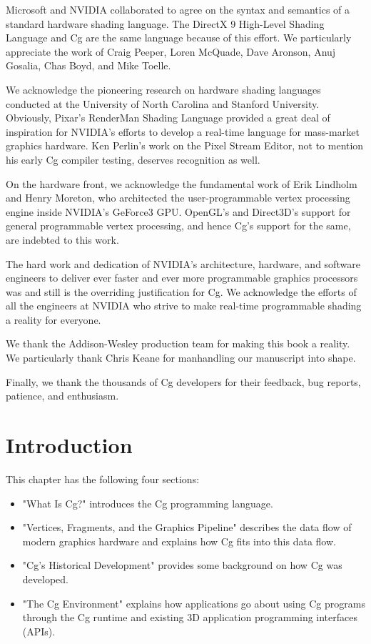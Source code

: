 \documentclass{book}
\begin{document}
Microsoft and NVIDIA collaborated to agree on the syntax and semantics of a standard hardware shading language. The DirectX 9 High-Level Shading Language and Cg are the same language because of this effort. We particularly appreciate the work of Craig Peeper, Loren McQuade, Dave Aronson, Anuj Gosalia, Chas Boyd, and Mike Toelle.

We acknowledge the pioneering research on hardware shading languages conducted at the University of North Carolina and Stanford University. Obviously, Pixar's RenderMan Shading Language provided a great deal of inspiration for NVIDIA's efforts to develop a real-time language for mass-market graphics hardware. Ken Perlin's work on the Pixel Stream Editor, not to mention his early Cg compiler testing, deserves recognition as well.

On the hardware front, we acknowledge the fundamental work of Erik Lindholm and Henry Moreton, who architected the user-programmable vertex processing engine inside NVIDIA's GeForce3 GPU. OpenGL's and Direct3D's support for general programmable vertex processing, and hence Cg's support for the same, are indebted to this work.

The hard work and dedication of NVIDIA's architecture, hardware, and software engineers to deliver ever faster and ever more programmable graphics processors was and still is the overriding justification for Cg. We acknowledge the efforts of all the engineers at NVIDIA who strive to make real-time programmable shading a reality for everyone.

We thank the Addison-Wesley production team for making this book a reality. We particularly thank Chris Keane for manhandling our manuscript into shape.

Finally, we thank the thousands of Cg developers for their feedback, bug reports, patience, and enthusiasm.

\chapter{Introduction}

This chapter has the following four sections:

\FloatBarrier
\begin{itemize}
\item "What Is Cg?" introduces the Cg programming language.
\item "Vertices, Fragments, and the Graphics Pipeline" describes the data flow of modern graphics hardware and explains how Cg fits into this data flow.
\item "Cg's Historical Development" provides some background on how Cg was developed.
\item "The Cg Environment" explains how applications go about using Cg programs through the Cg runtime and existing 3D application programming interfaces (APIs).
\end{itemize}
\FloatBarrier
\end{document}
